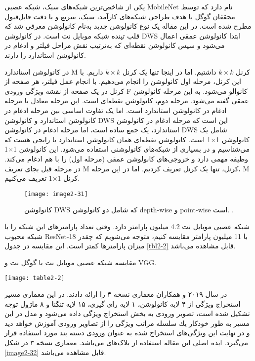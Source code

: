 \noindent
یکی از شاخص‌ترین شبکه‌های سبک، شبکه عصبی MobileNet نام دارد که توسط محققان گوگل \cite{howard2017mobilenets} با هدف طراحی شبکه‌های کارآمد، سبک، سریع و با دقت قابل‌قبول مطرح شده است. در این مقاله یک نوع کانولوشن جدید به‌نام کانولوشن   معرفی شد که قلب تپنده شبکه موبایل نت است. در کانولوشن DWS ابتدا کانولوشن عمقی اعمال می‌شود و سپس کانولوشن نقطه‌ای که به‌ترتیب نقش مراحل فیلتر و ادغام در کانولوشن استاندارد را دارند. 

\noindent
در کانولوشن استاندارد M کرنل $k \times k$ داشتیم. اما در اینجا تنها یک کرنل $k \times k$ داریم. با این کرنل، مرحله اول کانولوشن را انجام می‌دهیم. با انجام عمل فیلتر، هر صفحه از کرنل در یک صفحه از نقشه ویژگی ورودی F کانوالو می‌شود. به این مرحله کانولوشن عمقی گفته می‌شود.  مرحله دوم، کانولوشن نقطه‌ای  است. این مرحله معادل با مرحله ادغام در کانولوشن استاندارد است. اما یک تفاوت اساسی بین مرحله ادغام در کانولوشن استاندارد و کانولوشن DWS این است که مرحله ادغام در کانولوشن استاندارد، یک جمع ساده است، اما مرحله ادغام در کانولوشن DWS شامل یک کانولوشن 1×1 است. کانولوشن نقطه‌ای همان کانولوشن استاندارد یا رایجی هست که می‌شناسیم و در بسیاری از شبکه‌های کانولوشنی استفاده می‌شود. این کانولوشن 1×1 وظیفه مهمی دارد و خروجی‌های کانولوشن عمقی (مرحله اول) را با هم ادغام می‌کند. در مرحله قبل بجای تعریف M کرنل، تنها یک کرنل تعریف کردیم. اما در این مرحله، M کرنل 1×1 تعریف می‌کنیم.

\begin{figure}[h]
\centering
  \texttt{[image: image2-31]}
  \caption{
  کانولوشن DWS که شامل دو کانولوشن depth-wise و point-wise است. 
   \cite{howard2017mobilenets}.}
  \label{image2-31}
\end{figure}

\noindent
شبکه عصبی موبایل نت 4.2 میلیون پارامتر دارد. وقتی تعداد پارامترهای این شبکه را با شبکه محبوب ResNet-18 با 11 میلیون پارامتر مقایسه کنیم، متوجه می‌شویم که چقدر میزان پارامترها کمتر است. این مقایسه در جدول \ref{tbl2-2} قابل مشاهده می‌باشد.

\begin{table}
\centering
  \caption{ مقایسه شبکه عصبی موبایل نت با گوگل نت و VGG.}
  \label{tbl2-2}
  \texttt{[image: table2-2]}
\end{table}

\noindent
در سال ۲۰۱۹   و همکاران \cite{howard2019searching} معماری  نسخه ۳ را ارائه دادند. در این معماری مسیر استخراج ویژگی از ۴ لایه كانولوشن، ۱ لایه رای گیری، ۱۵ لایه تنگنا   و ۸ ماژول توجه  تشکیل شده است، تصویر ورودی به بخش استخراج ویژگی داده می‌شود و مدل در این مسیر به طور خودكار یك سلسله مراتب ویژگی را از تصاویر ورودی آموزش خواهد دید و در نهایت این ویژگی‌های استخراج شده به عنوان ورودی دسته بند مورد استفاده قرار می‌گیرد. ایده اصلی این مقاله استفاده از بلاک‌های  می‌باشد. معماری  نسخه ۳ در شکل \ref{image2-32} قابل مشاهده می‌باشد. 


